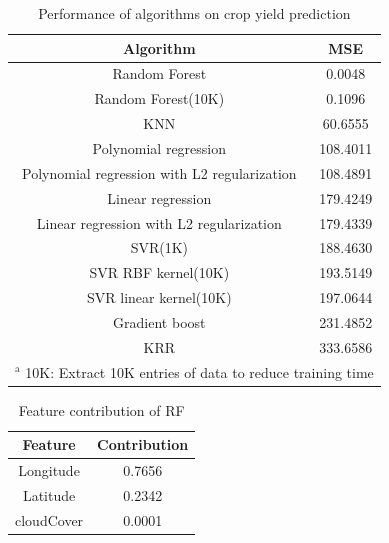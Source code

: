 \documentclass[conference, a4paper]{IEEEtran}
\begin{document}
  \begin{table}[htbp]
    \caption{Performance of algorithms on crop yield prediction}
    \begin{center}
    \begin{tabular}{|c|c|}
    \hline
    Algorithm                                    & MSE      \\
    \hline
    Random Forest \cite{liaw2002classification}                               & 0.0048   \\
    Random Forest(10K)                           & 0.1096   \\
    KNN \cite{peterson2009k}                                         & 60.6555  \\
    Polynomial regression  \cite{theil1992rank}                      & 108.4011 \\
    Polynomial regression with L2 regularization & 108.4891 \\
    Linear regression \cite{vapnik2013nature}                           & 179.4249 \\
    Linear regression with L2 regularization     & 179.4339 \\
    SVR(1K) \cite{drucker1997support}                                     & 188.4630 \\
    SVR RBF kernel(10K) \cite{cristianini2000introduction}                         & 193.5149 \\
    SVR linear kernel(10K) \cite{cristianini2000introduction}                      & 197.0644 \\
    Gradient boost \cite{ke2017lightgbm}                              & 231.4852 \\
    KRR  \cite{saunders1998ridge}                                        & 333.6586 \\
    \hline
    \multicolumn{2}{l}{$^{\mathrm{a}}$ 10K: Extract 10K entries of data to reduce training time} \\
    \end{tabular}
    \label{tab:result}
    \end{center}
  \end{table}

  \begin{table}[htbp]
      \caption{Feature contribution of RF}
      \begin{center}
      \begin{tabular}{|c|c|}
      \hline
        Feature & Contribution \\
      \hline
        Longitude & 0.7656 \\
        Latitude & 0.2342 \\
        cloudCover & 0.0001 \\
      \hline
      \end{tabular}
      \label{tab:RF_contribution}
      \end{center}
  \end{table}
\end{document}
